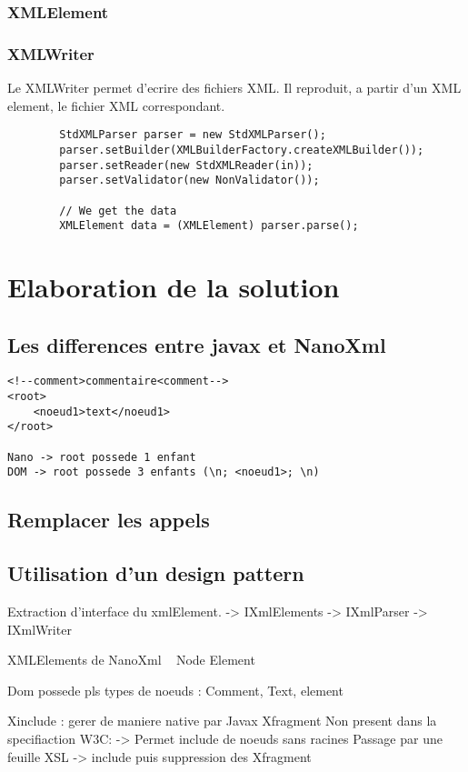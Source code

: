 \subsubsection{XMLElement}

\subsubsection{XMLWriter}
Le XMLWriter permet d'ecrire des fichiers XML. Il reproduit, a partir d'un XML element, le fichier XML correspondant.




\begin{verbatim}
        StdXMLParser parser = new StdXMLParser();
        parser.setBuilder(XMLBuilderFactory.createXMLBuilder());
        parser.setReader(new StdXMLReader(in));
        parser.setValidator(new NonValidator());

        // We get the data
        XMLElement data = (XMLElement) parser.parse();
\end{verbatim}

\section{Elaboration de la solution}
\subsection{Les differences entre javax et NanoXml}
\begin{verbatim}
<!--comment>commentaire<comment-->
<root>
	<noeud1>text</noeud1>
</root>

Nano -> root possede 1 enfant
DOM -> root possede 3 enfants (\n; <noeud1>; \n)
\end{verbatim}
\subsection{Remplacer les appels}
\subsection{Utilisation d'un design pattern}
Extraction d'interface du xmlElement.
-> IXmlElements
-> IXmlParser
-> IXmlWriter

XMLElements de NanoXml ~ Node Element

Dom possede pls types de noeuds : Comment, Text, element

Xinclude : gerer de maniere native par Javax
Xfragment Non present dans la specifiaction W3C:
-> Permet include de noeuds sans racines
Passage par une feuille XSL
-> include puis suppression des Xfragment
